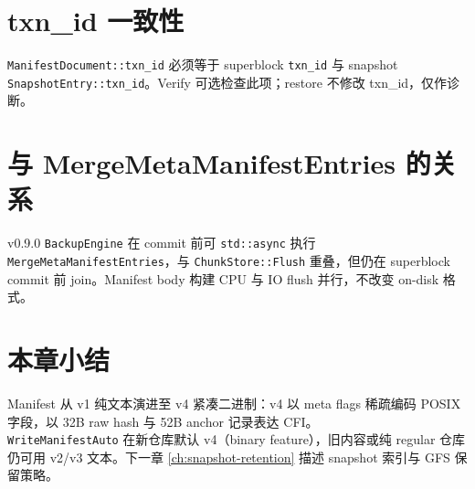\section{txn\_id 一致性}

\texttt{ManifestDocument::txn\_id} 必须等于 superblock \texttt{txn\_id} 与 snapshot \texttt{SnapshotEntry::txn\_id}。Verify 可选检查此项；restore 不修改 txn\_id，仅作诊断。

\section{与 MergeMetaManifestEntries 的关系}

v0.9.0 \texttt{BackupEngine} 在 commit 前可 \texttt{std::async} 执行 \texttt{MergeMetaManifestEntries}，与 \texttt{ChunkStore::Flush} 重叠，但仍在 superblock commit 前 join。Manifest body 构建 CPU 与 IO flush 并行，不改变 on-disk 格式。

\section{本章小结}

Manifest 从 v1 纯文本演进至 v4 紧凑二进制：v4 以 meta flags 稀疏编码 POSIX 字段，以 32B raw hash 与 52B anchor 记录表达 CFI。\\
\texttt{WriteManifestAuto} 在新仓库默认 v4（binary feature），旧内容或纯 regular 仓库仍可用 v2/v3 文本。下一章 \cref{ch:snapshot-retention} 描述 snapshot 索引与 GFS 保留策略。

